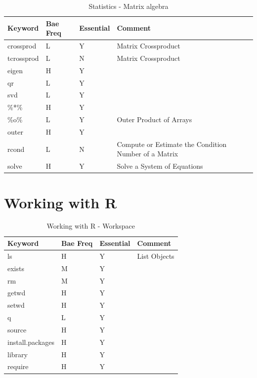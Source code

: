 \documentclass[11pt,]{krantz}
\theoremstyle{definition}
\theoremstyle{definition}
\theoremstyle{remark}
\begin{document}
\begin{table}

\caption{\label{tab:knitchunk20}Statistics - Matrix algebra }
\centering
\begin{tabular}[t]{llll}
\toprule
Keyword & Bae Freq & Essential & Comment\\
\midrule
crossprod & L & Y & Matrix Crossproduct\\
tcrossprod & L & N & Matrix Crossproduct\\
eigen & H & Y & \\
qr & L & Y & \\
svd & L & Y & \\
\addlinespace
\%*\% & H & Y & \\
\%o\% & L & Y & Outer Product of Arrays\\
outer & H & Y & \\
rcond & L & N & Compute or Estimate the Condition Number of a Matrix\\
solve & H & Y & Solve a System of Equations\\
\bottomrule
\end{tabular}
\end{table}

\section{Working with R}\label{working-with-r}

\begin{table}

\caption{\label{tab:knitchunk21}Working with R - Workspace }
\centering
\begin{tabular}[t]{llll}
\toprule
Keyword & Bae Freq & Essential & Comment\\
\midrule
ls & H & Y & List Objects\\
exists & M & Y & \\
rm & M & Y & \\
getwd & H & Y & \\
setwd & H & Y & \\
\addlinespace
q & L & Y & \\
source & H & Y & \\
install.packages & H & Y & \\
library & H & Y & \\
require & H & Y & \\
\bottomrule
\end{tabular}
\end{table}
\end{document}
